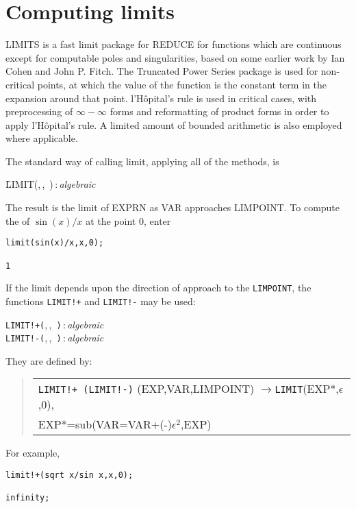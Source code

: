 \section{Computing limits}

LIMITS is a fast limit package for REDUCE for functions which are
continuous except for computable poles and singularities, based on some
earlier work by Ian Cohen and John P. Fitch.  The Truncated Power Series
package is used for non-critical points, at which the value of the
function is the constant term in the expansion around that point.
l'H\^opital's rule is used in critical cases, with preprocessing of
$\infty - \infty$ forms and reformatting of product forms in order
to apply l'H\^opital's rule.  A limited amount of bounded arithmetic
is also employed where applicable.

The standard way of calling limit, applying all of the methods, is
\hypertarget{operator:LIMIT}{}
\begin{syntax}
  \f{LIMIT(},\,,\,%
    )\,:\,\textit{algebraic}
\end{syntax}
The result is the limit of EXPRN as VAR approaches LIMPOINT.
To compute the of \(\sin(x)/x\) at the point $0$, enter
\begin{verbatim}
limit(sin(x)/x,x,0);

1
\end{verbatim}
If the limit depends upon the direction of approach to the \texttt{LIMPOINT},                                                                                                         the functions \texttt{LIMIT!+} and \texttt{LIMIT!-} may be used:
 
\hypertarget{operator:LIMIT+}{}
\hypertarget{operator:LIMIT-}{}
\begin{syntaxtable}
  \texttt{LIMIT!+(},\,,\,%
    \texttt{)}\,:\,\textit{algebraic} \\
  \texttt{LIMIT!-(},\,,\,%
    \texttt{)}\,:\,\textit{algebraic}
\end{syntaxtable}
They are defined by:
\begin{quote}
\begin{tabular}{l}
 \texttt{LIMIT!+ (LIMIT!-)} (EXP,VAR,LIMPOINT) $\rightarrow$\texttt{LIMIT}(EXP*,$\epsilon$,0), \\
  \qquad EXP*=sub(VAR=VAR+(-)$\epsilon^2$,EXP)
\end{tabular}
\end{quote}
For example,
\begin{verbatim}
limit!+(sqrt x/sin x,x,0);

infinity;
\end{verbatim}


